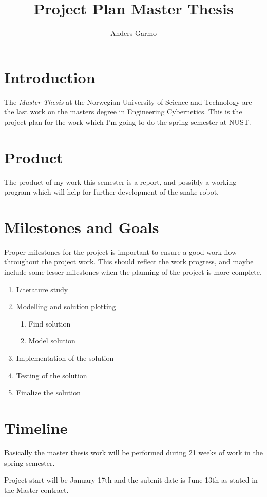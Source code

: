 \documentclass[a4paper, 10pt]{article}
\title{Project Plan Master Thesis}
\author{Anders Garmo}
\begin{document}
\maketitle


\section{Introduction}
The \emph{Master Thesis} at the Norwegian University of Science and Technology are the
last work on the masters degree in Engineering Cybernetics. This is the project plan for
the work which I'm going to do the spring semester at NUST. 

\section{Product}
The product of my work this semester is a report, and possibly a working program which
will help for further development of the snake robot. 


\section{Milestones and Goals}
Proper milestones for the project is important to ensure a good work flow throughout the
project work. This should reflect the work progress, and maybe include some lesser
milestones when the planning of the project is more complete.

\begin{enumerate}
    \item Literature study
    \item Modelling and solution plotting
        \begin{enumerate}
            \item Find solution
            \item Model solution
        \end{enumerate}
    \item Implementation of the solution
    \item Testing of the solution
    \item Finalize the solution
\end{enumerate}



\section{Timeline}
Basically the master thesis work will be performed during 21 weeks of work in the spring
semester. 

Project start will be January 17th and the submit date is June 13th as stated in the
Master contract. 
\end{document}
